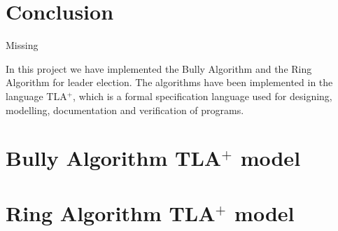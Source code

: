 \documentclass{report}
\begin{document}
\chapter{Conclusion}

\begin{callout}
  Missing
  \end{callout}

In this project we have implemented the Bully Algorithm and the Ring Algorithm for leader election. The algorithms have been implemented in the language TLA$^{+}$, which is a formal specification language used for designing, modelling, documentation and verification of programs.




\appendix

\chapter{Bully Algorithm TLA$^{+}$ model}



\chapter{Ring Algorithm TLA$^{+}$ model}
\end{document}
